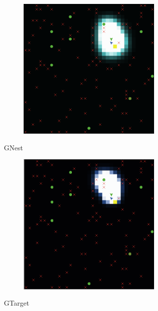 \documentclass{beamer}
\begin{document}
\begin{frame}

  \begin{figure}
    \centering
    \includegraphics[width=7cm]{pheromones_tohome.png}
  \end{figure}

  \vfill

  \begin{center}
    GNest
  \end{center}

\end{frame}

\begin{frame}

  \begin{figure}
    \centering
    \includegraphics[width=7cm]{pheromones_totarget.png}
  \end{figure}

  \vfill

  \begin{center}
    GTarget
  \end{center}

\end{frame}
\end{document}
